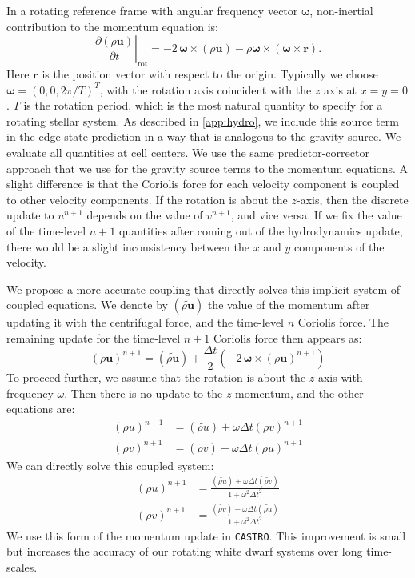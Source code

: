 \documentclass[iop]{../emulateapj}
\newcommand{\castro}{\texttt{CASTRO}}
\begin{document}
In a rotating reference frame with angular frequency vector $\bm{\omega}$,
non-inertial contribution to the momentum equation is:
\begin{equation}
  \left.\frac{\partial(\rho \mathbf{u})}{\partial t}\right|_{\text{rot}} = -2\, {\bm\omega} \times (\rho\mathbf{u}) - \rho {\bm\omega} \times \left({\bm\omega} \times \mathbf{r}\right).
\end{equation}
Here $\mathbf{r}$ is the position vector with respect to the origin. Typically we choose $\bm{\omega} = (0, 0, 2\pi / T)^T$,
with the rotation axis coincident with the $z$ axis at $x = y = 0$.
$T$ is the rotation period, which is the most natural quantity to specify
for a rotating stellar system. As described in \autoref{app:hydro}, we include this source term
in the edge state prediction in a way that is analogous to the gravity source.
We evaluate all quantities at cell centers. We use the same predictor-corrector 
approach that we use for the gravity source terms to the momentum equations. A slight 
difference is that the Coriolis force for each velocity component is coupled to other velocity 
components. If the rotation is about the $z$-axis, then the discrete update to 
$u^{n+1}$ depends on the value of $v^{n+1}$, and vice versa. If we fix the value of 
the time-level $n+1$ quantities after coming out of the hydrodynamics update, there 
would be a slight inconsistency between the $x$ and $y$ components of the velocity. 

We propose a more accurate coupling that directly solves this implicit system of coupled 
equations. We denote by $(\widetilde{\rho \mathbf{u}})$ the value of the momentum after 
updating it with the centrifugal force, and the time-level $n$ Coriolis force. The remaining 
update for the time-level $n+1$ Coriolis force then appears as:
\begin{equation}
  (\rho \mathbf{u})^{n+1} = (\widetilde{\rho\mathbf{u}}) + \frac{\Delta t}{2} \left(-2\, {\bm\omega} \times (\rho\mathbf{u})^{n+1}\right)
\end{equation}
To proceed further, we assume that the rotation is about the $z$ axis with frequency $\omega$. 
Then there is no update to the $z$-momentum, and the other equations are:
\begin{align}
  (\rho u)^{n+1} &= (\widetilde{\rho u}) + \omega \Delta t (\rho v)^{n+1} \\
  (\rho v)^{n+1} &= (\widetilde{\rho v}) - \omega \Delta t (\rho u)^{n+1}
\end{align} 
We can directly solve this coupled system:
\begin{align}
  (\rho u)^{n+1} &= \frac{ (\widetilde{\rho u}) + \omega \Delta t (\widetilde{\rho v})}{1 + \omega^2 \Delta t^2} \\
  (\rho v)^{n+1} &= \frac{ (\widetilde{\rho v}) - \omega \Delta t (\widetilde{\rho u})}{1 + \omega^2 \Delta t^2}
\end{align}
We use this form of the momentum update in \castro. This improvement is small
but increases the accuracy of our rotating white dwarf systems over long time-scales.
\end{document}

